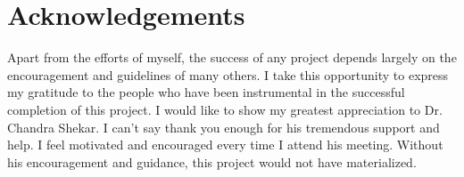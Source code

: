 \chapter*{\centering Acknowledgements}
\quad Apart from the efforts of myself, the success of any project depends largely on the encouragement and guidelines of many others. I take this opportunity to express my gratitude to the people who have been instrumental in the successful completion of this project. I would like to show my greatest appreciation to Dr. Chandra Shekar. I can’t say thank you enough for his tremendous support and help. I feel motivated and encouraged every time I attend his meeting. Without his encouragement and guidance, this project would not have materialized.